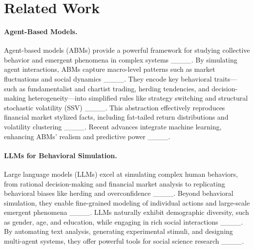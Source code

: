 \section{Related Work}
\paragraph{Agent-Based Models.}
Agent-based models (ABMs) provide a powerful framework for studying collective behavior and emergent phenomena in complex systems ____. By simulating agent interactions, ABMs capture macro-level patterns such as market fluctuations and social dynamics ____. They encode key behavioral traits—such as fundamentalist and chartist trading, herding tendencies, and decision-making heterogeneity—into simplified rules like strategy switching and structural stochastic volatility (SSV) ____. This abstraction effectively reproduces financial market stylized facts, including fat-tailed return distributions and volatility clustering ____. Recent advances integrate machine learning, enhancing ABMs' realism and predictive power ____.

\paragraph{LLMs for Behavioral Simulation.} 


Large language models (LLMs) excel at simulating complex human behaviors, from rational decision-making and financial market analysis to replicating behavioral biases like herding and overconfidence ____. Beyond behavioral simulation, they enable fine-grained modeling of individual actions and large-scale emergent phenomena ____. LLMs naturally exhibit demographic diversity, such as gender, age, and education, while engaging in rich social interactions ____. By automating text analysis, generating experimental stimuli, and designing multi-agent systems, they offer powerful tools for social science research ____.